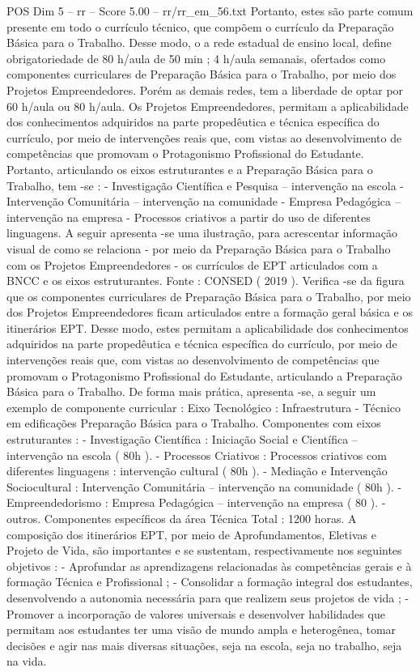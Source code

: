 \begin{textsample}{POS Dim 5 – rr – Score 5.00 – rr/rr\_em\_56.txt}
Portanto, estes são parte comum presente em todo o currículo técnico, que compõem o currículo da Preparação Básica para o Trabalho.
Desse modo, o a rede estadual de ensino local, define obrigatoriedade de 80 h/aula de 50 min ; 4 h/aula semanais, ofertados como componentes curriculares de Preparação Básica para o Trabalho, por meio dos Projetos Empreendedores.
Porém as demais redes, tem a liberdade de optar por 60 h/aula ou 80 h/aula.
Os Projetos Empreendedores, permitam a aplicabilidade dos conhecimentos adquiridos na parte propedêutica e técnica específica do currículo, por meio de intervenções reais que, com vistas ao desenvolvimento de competências que promovam o Protagonismo Profissional do Estudante.
Portanto, articulando os eixos estruturantes e a Preparação Básica para o Trabalho, tem -se : - Investigação Científica e Pesquisa – intervenção na escola - Intervenção Comunitária – intervenção na comunidade - Empresa Pedagógica – intervenção na empresa - Processos criativos a partir do uso de diferentes linguagens.
A seguir apresenta -se uma ilustração, para acrescentar informação visual de como se relaciona - por meio da Preparação Básica para o Trabalho com os Projetos Empreendedores - os currículos de EPT articulados com a BNCC e os eixos estruturantes.
Fonte : CONSED ( 2019 ).
Verifica -se da figura que os componentes curriculares de Preparação Básica para o Trabalho, por meio dos Projetos Empreendedores ficam articulados entre a formação geral básica e os itinerários EPT.
Desse modo, estes permitam a aplicabilidade dos conhecimentos adquiridos na parte propedêutica e técnica específica do currículo, por meio de intervenções reais que, com vistas ao desenvolvimento de competências que promovam o Protagonismo Profissional do Estudante, articulando a Preparação Básica para o Trabalho.
De forma mais prática, apresenta -se, a seguir um exemplo de componente curricular : Eixo Tecnológico : Infraestrutura - Técnico em edificações Preparação Básica para o Trabalho.
Componentes com eixos estruturantes : - Investigação Científica : Iniciação Social e Científica – intervenção na escola ( 80h ). - Processos Criativos : Processos criativos com diferentes linguagens : intervenção cultural ( 80h ). - Mediação e Intervenção Sociocultural : Intervenção Comunitária – intervenção na comunidade ( 80h ). - Empreendedorismo : Empresa Pedagógica – intervenção na empresa ( 80 ). - outros.
Componentes específicos da área Técnica Total : 1200 horas.
A composição dos itinerários EPT, por meio de Aprofundamentos, Eletivas e Projeto de Vida, são importantes e se sustentam, respectivamente nos seguintes objetivos : - Aprofundar as aprendizagens relacionadas às competências gerais e à formação Técnica e Profissional ; - Consolidar a formação integral dos estudantes, desenvolvendo a autonomia necessária para que realizem seus projetos de vida ; - Promover a incorporação de valores universais e desenvolver habilidades que permitam aos estudantes ter uma visão de mundo ampla e heterogênea, tomar decisões e agir nas mais diversas situações, seja na escola, seja no trabalho, seja na vida.

\end{textsample}
